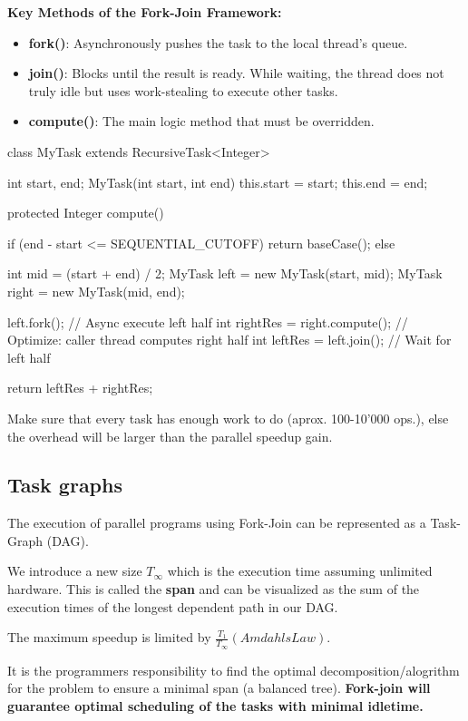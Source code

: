\textbf{Key Methods of the Fork-Join Framework:}
\begin{itemize}
    \item \textbf{fork()}: Asynchronously pushes the task to the local thread's queue.
    \item \textbf{join()}: Blocks until the result is ready. While waiting, the thread does not truly idle but uses work-stealing to execute other tasks.
    \item \textbf{compute()}: The main logic method that must be overridden.
\end{itemize}

\begin{codeexample}
class MyTask extends RecursiveTask<Integer> {
    int start, end;
    MyTask(int start, int end) { this.start = start; this.end = end; }
    
    protected Integer compute() {
        if (end - start <= SEQUENTIAL_CUTOFF) { 
            return baseCase(); 
        } else {
            int mid = (start + end) / 2;
            MyTask left = new MyTask(start, mid);
            MyTask right = new MyTask(mid, end);
            
            left.fork(); // Async execute left half
            int rightRes = right.compute(); // Optimize: caller thread computes right half
            int leftRes = left.join();      // Wait for left half
            
            return leftRes + rightRes;
        } 
    }
}
\end{codeexample}

\begin{important}
    Make sure that every task has enough work to do (aprox. 100-10'000 ops.), else the overhead will be larger than the parallel speedup gain.
\end{important}

\subsection{Task graphs}

The execution of parallel programs using Fork-Join can be represented as a Task-Graph (DAG).

\begin{definition}
    We introduce a new size $T_{\infty}$ which is the execution time assuming unlimited hardware. This is called the \textbf{span} and can be visualized as the sum of the execution times of the longest dependent path in our DAG.
\end{definition}

\begin{remark}
    The maximum speedup is limited by $\frac{T_1}{T_{\infty}} (Amdahls Law)$.
\end{remark}

It is the programmers responsibility to find the optimal decomposition/alogrithm for the problem to ensure a
minimal span (a balanced tree). \textbf{Fork-join will guarantee optimal scheduling of the tasks with minimal idletime.}

        